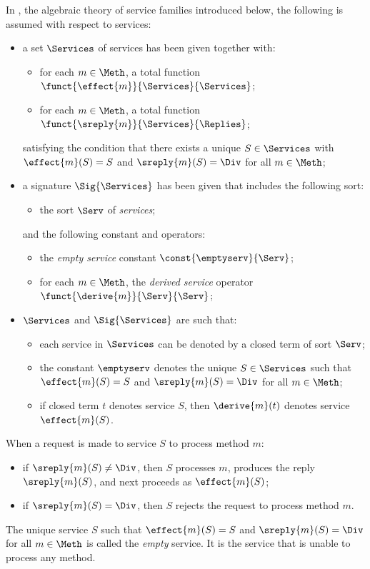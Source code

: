 \documentclass[fleqn]{llncs}
\begin{document}
In \SFA, the algebraic theory of service families introduced below, the
following is assumed with respect to services:
\begin{itemize}
\item
a set $\Services$ of services has been given together with:
\begin{itemize}
\item
for each $m \in \Meth$,
a total function $\funct{\effect{m}}{\Services}{\Services}$;
\item
for each $m \in \Meth$,
a total function $\funct{\sreply{m}}{\Services}{\Replies}$;
\end{itemize}
satisfying the condition that there exists a unique $S \in \Services$
with $\effect{m}(S) = S$ and $\sreply{m}(S) = \Div$ for all
$m \in \Meth$;
\item
a signature $\Sig{\Services}$ has been given that includes the following
sort:
\begin{itemize}
\item
the sort $\Serv$ of \emph{services};
\end{itemize}
and the following constant and operators:
\begin{itemize}
\item
the \emph{empty service} constant $\const{\emptyserv}{\Serv}$;
\item
for each $m \in \Meth$,
the \emph{derived service} operator
$\funct{\derive{m}}{\Serv}{\Serv}$;
\end{itemize}
\item
$\Services$ and $\Sig{\Services}$ are such that:
\begin{itemize}
\item
each service in $\Services$ can be denoted by a closed term of sort
$\Serv$;
\item
the constant $\emptyserv$ denotes the unique $S \in \Services$ such
that $\effect{m}(S) = S$ and $\sreply{m}(S) = \Div$ for all
$m \in \Meth$;
\item
if closed term $t$ denotes service $S$, then $\derive{m}(t)$ denotes
service $\effect{m}(S)$.
\end{itemize}
\end{itemize}

When a request is made to service $S$ to process method $m$:
\begin{itemize}
\item
if $\sreply{m}(S) \neq \Div$, then $S$ processes $m$, produces the reply
$\sreply{m}(S)$, and next proceeds as $\effect{m}(S)$;
\item
if $\sreply{m}(S) = \Div$, then $S$ rejects the request to process
method $m$.
\end{itemize}
The unique service $S$ such that $\effect{m}(S) = S$ and
$\sreply{m}(S) = \Div$ for all $m \in \Meth$ is called the \emph{empty}
service.
It is the service that is unable to process any method.
\end{document}

